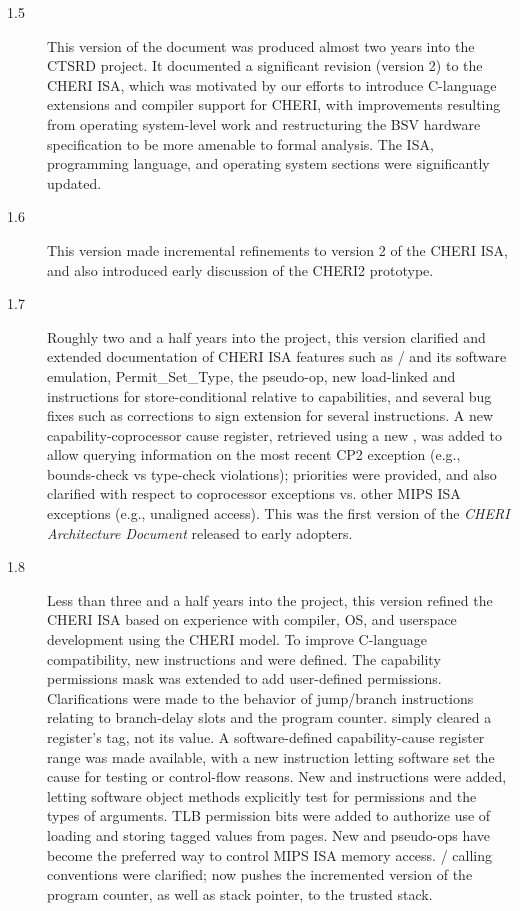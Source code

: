 \begin{description}
\item[1.5] This version of the document was produced almost two years
  into the CTSRD project.  It documented a significant revision (version 2) to
  the CHERI ISA, which was motivated by our efforts to introduce
  C-language extensions and compiler support for CHERI, with
  improvements resulting from operating system-level work and
  restructuring the BSV hardware specification to be more
  amenable to formal analysis.  The ISA, programming language, and
  operating system sections were significantly updated.

\item[1.6] This version made incremental refinements to version 2 of the
  CHERI ISA, and also introduced early discussion of the CHERI2 prototype.

\item[1.7] Roughly two and a half years into the project, this version
  clarified and extended documentation of CHERI ISA features such as
  / and its software emulation,
  Permit\_Set\_Type, the 
  pseudo-op, new load-linked and instructions for store-conditional relative
  to capabilities, and several bug fixes such as corrections to sign extension
  for several instructions.
  A new capability-coprocessor {\pathname cause} register, retrieved using a new
  , was added to allow querying information on the
  most recent
  CP2 exception (e.g., bounds-check vs type-check violations); priorities were
  provided, and also clarified with respect to coprocessor exceptions vs.
  other MIPS ISA exceptions (e.g., unaligned access).
  This was the first version of the {\em CHERI Architecture Document} released
  to early adopters.

\item[1.8] Less than three and a half years into the project, this version
  refined the CHERI ISA based on experience with compiler, OS, and userspace
  development using the CHERI model.
  To improve C-language compatibility, new instructions 
  and  were defined.
  The capability permissions mask was extended to add user-defined permissions.
  Clarifications were made to the behavior of jump/branch instructions relating
  to branch-delay slots and the program counter.
   simply cleared a register's tag, not its value.
  A software-defined capability-cause register range was made available, with a
  new  instruction letting software set the cause for
  testing or control-flow reasons.
  New  and  instructions
  were added, letting software
  object methods explicitly test for permissions and the types of arguments.
  TLB permission bits were added to authorize use of loading and storing
  tagged values from pages.
  New  and  pseudo-ops
  have become the preferred way to control MIPS ISA memory access.
  / calling conventions were
  clarified;  now pushes the
  incremented version of the program counter, as well as stack pointer, to the
  trusted stack.


\end{description}

